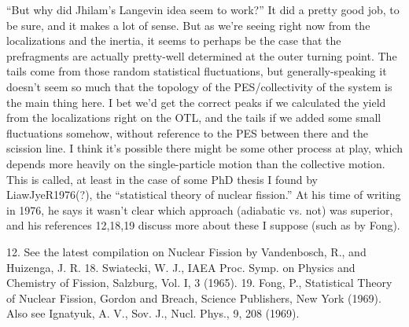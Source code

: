 ``But why did Jhilam's Langevin idea seem to work?'' It did a pretty good job, to be sure, and it makes a lot of sense. But as we're seeing right now from the localizations and the inertia, it seems to perhaps be the case that the prefragments are actually pretty-well determined at the outer turning point. The tails come from those random statistical fluctuations, but generally-speaking it doesn't seem so much that the topology of the PES/collectivity of the system is the main thing here. I bet we'd get the correct peaks if we calculated the yield from the localizations right on the OTL, and the tails if we added some small fluctuations somehow, without reference to the PES between there and the scission line. I think it's possible there might be some other process at play, which depends more heavily on the single-particle motion than the collective motion. This is called, at least in the case of some PhD thesis I found by LiawJyeR1976(?), the ``statistical theory of nuclear fission.'' At his time of writing in 1976, he says it wasn't clear which approach (adiabatic vs. not) was superior, and his references 12,18,19 discuss more about these I suppose (such as by Fong).

12. See the latest compilation on Nuclear Fission by Vandenbosch, R.,
and Huizenga, J. R.
18. Swiatecki, W. J., IAEA Proc. Symp. on Physics and Chemistry of
Fission, Salzburg, Vol. I, 3 (1965).
19. Fong, P., Statistical Theory of Nuclear Fission, Gordon and
Breach, Science Publishers, New York (1969). Also see Ignatyuk,
A. V., Sov. J., Nucl. Phys., 9, 208 (1969).